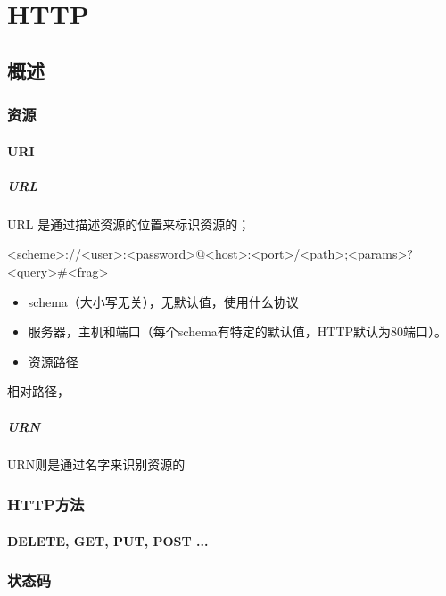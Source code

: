 \chapter{HTTP}

\section{概述}


\subsection{资源}


\subsubsection{URI}

\paragraph{URL}
URL 是通过描述资源的位置来标识资源的；


\begin{Bash}[格式]
<scheme>://<user>:<password>@<host>:<port>/<path>;<params>?<query>#<frag>
\end{Bash}

\begin{itemize}
\item schema（大小写无关），无默认值，使用什么协议
\item 服务器，主机和端口（每个schema有特定的默认值，HTTP默认为80端口）。
\item 资源路径
\end{itemize}

相对路径，

\paragraph{URN}
URN则是通过名字来识别资源的
\subsection{HTTP方法}

\subsubsection{DELETE, GET, PUT, POST ...}


\subsection{状态码}

